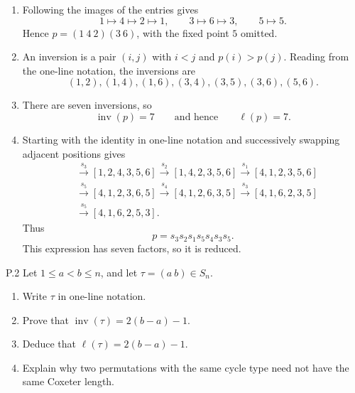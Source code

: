 \documentclass[11pt]{article}
\begin{document}
\begin{solution}
\begin{enumerate}[label=\textbf{(\alph*)}]
  \item Following the images of the entries gives
  \[
    1\mapsto4\mapsto2\mapsto1,
    \qquad 3\mapsto6\mapsto3,
    \qquad 5\mapsto5.
  \]
  Hence $p=(1\ 4\ 2)(3\ 6)$, with the fixed point $5$ omitted.

  \item An inversion is a pair $(i,j)$ with $i<j$ and $p(i)>p(j)$.
  Reading from the one-line notation, the inversions are
  \[
  (1,2),(1,4),(1,6),
  (3,4),(3,5),(3,6),(5,6).
  \]

  \item There are seven inversions, so
  \[
    \operatorname{inv}(p)=7
    \qquad\text{and hence}\qquad
    \ell(p)=7.
  \]

  \item Starting with the identity in one-line notation and successively
  swapping adjacent positions gives
  \begin{align*}
  [1,2,3,4,5,6]
  &\xrightarrow{s_3}[1,2,4,3,5,6]
  \xrightarrow{s_2}[1,4,2,3,5,6]
  \xrightarrow{s_1}[4,1,2,3,5,6]\\
  &\xrightarrow{s_5}[4,1,2,3,6,5]
  \xrightarrow{s_4}[4,1,2,6,3,5]
  \xrightarrow{s_3}[4,1,6,2,3,5]\\
  &\xrightarrow{s_5}[4,1,6,2,5,3].
  \end{align*}
  Thus
  \[
    \boxed{p=s_3s_2s_1s_5s_4s_3s_5}.
  \]
  This expression has seven factors, so it is reduced.
\end{enumerate}
\end{solution}

\begin{exercise}{P.2}
Let $1\leq a<b\leq n$, and let $\tau=(a\ b)\in S_n$.
\begin{enumerate}[label=\textbf{(\alph*)}]
  \item Write $\tau$ in one-line notation.
  \item Prove that $\operatorname{inv}(\tau)=2(b-a)-1$.
  \item Deduce that $\ell(\tau)=2(b-a)-1$.
  \item Explain why two permutations with the same cycle type need not have
        the same Coxeter length.
\end{enumerate}
\end{exercise}
\end{document}
